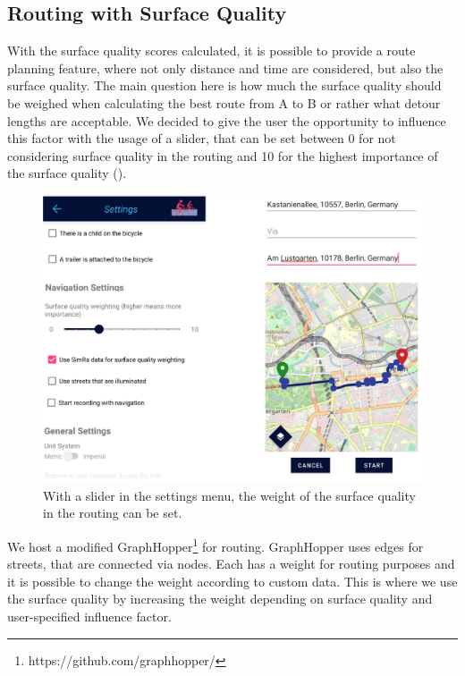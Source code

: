 \subsection{Routing with Surface Quality}
\label{subsec:routing_with_surface_quality}
With the surface quality scores calculated, it is possible to provide a route planning feature, where not only distance and time are considered, but also the surface quality.
The main question here is how much the surface quality should be weighed when calculating the best route from A to B or rather what detour lengths are acceptable.
We decided to give the user the opportunity to influence this factor with the usage of a slider, that can be set between 0 for not considering surface quality in the routing and 10 for the highest importance of the surface quality ().
 \begin{figure}
    \centering
    \includegraphics[width=0.7\columnwidth]{fig/routing_settings_2.png}
    \caption{%
With a slider in the settings menu, the weight of the surface quality in the routing can be set.}%
    \label{fig:routing}
\end{figure}
We host a modified GraphHopper\footnote{https://github.com/graphhopper/} for routing.
GraphHopper uses edges for streets, that are connected via nodes.
Each has a weight for routing purposes and it is possible to change the weight according to custom data.
This is where we use the surface quality by increasing the weight depending on surface quality and user-specified influence factor.

